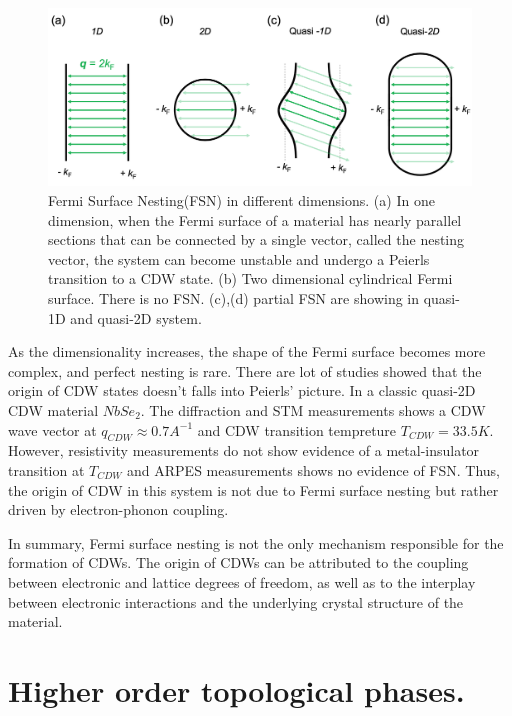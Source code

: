  \begin{figure}[h]
    \centering
    \includegraphics[width =\textwidth]{images/FSN.png}
    \caption{Fermi Surface Nesting(FSN) in different dimensions\cite{sayers2020charge}. (a) In one dimension, when the Fermi surface of a material has nearly parallel sections that can be connected by a single vector, called the nesting vector, the system can become unstable and undergo a Peierls transition to a CDW state. (b) Two dimensional cylindrical Fermi surface. There is no FSN. (c),(d) partial FSN are showing in quasi-1D and quasi-2D system. }
    \label{fig:FSN}
\end{figure}

As the dimensionality increases, the shape of the Fermi surface becomes more complex, and perfect nesting is rare.  There are lot of studies showed that the origin of CDW states doesn't falls into Peierls' picture. In a classic quasi-2D CDW material $NbSe_2$. The diffraction\cite{moncton1975study,du2000x} and STM\cite{arguello2014visualizing} measurements shows a CDW wave vector at $q_{CDW}\approx 0.7A^{-1}$ and CDW transition tempreture $T_{CDW}=33.5K$. However, resistivity measurements do not show evidence of a metal-insulator transition at $T_{CDW}$ and ARPES measurements\cite{zhu2015classification} shows no evidence of FSN. Thus, the origin of CDW in this system is not due to Fermi surface nesting but rather driven by electron-phonon coupling.

In summary, Fermi surface nesting is not the only mechanism responsible for the formation of CDWs\cite{johannes2008fermi}. The origin of CDWs can be attributed to the coupling between electronic and lattice degrees of freedom, as well as to the interplay between electronic interactions and the underlying crystal structure of the material.




\section{Higher order topological phases.}
